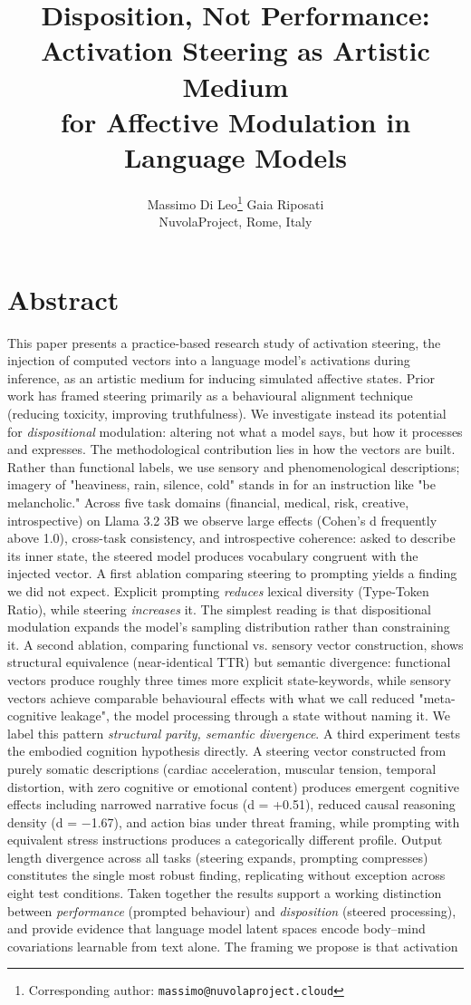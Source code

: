 \documentclass[11pt,a4paper]{article}
\title{Disposition, Not Performance:\\
Activation Steering as Artistic Medium\\
for Affective Modulation in Language Models}
\author{Massimo Di Leo\thanks{Corresponding author: \texttt{massimo@nuvolaproject.cloud}} \quad Gaia Riposati \\
\small NuvolaProject, Rome, Italy}
\date{}
\begin{document}
\maketitle

\section*{Abstract}

This paper presents a practice-based research study of activation steering, the injection of computed vectors into a language model's activations during inference, as an artistic medium for inducing simulated affective states. Prior work has framed steering primarily as a behavioural alignment technique (reducing toxicity, improving truthfulness). We investigate instead its potential for \emph{dispositional} modulation: altering not what a model says, but how it processes and expresses. The methodological contribution lies in how the vectors are built. Rather than functional labels, we use sensory and phenomenological descriptions; imagery of "heaviness, rain, silence, cold" stands in for an instruction like "be melancholic." Across five task domains (financial, medical, risk, creative, introspective) on Llama 3.2 3B we observe large effects (Cohen's d frequently above 1.0), cross-task consistency, and introspective coherence: asked to describe its inner state, the steered model produces vocabulary congruent with the injected vector. A first ablation comparing steering to prompting yields a finding we did not expect. Explicit prompting \emph{reduces} lexical diversity (Type-Token Ratio), while steering \emph{increases} it. The simplest reading is that dispositional modulation expands the model's sampling distribution rather than constraining it. A second ablation, comparing functional vs. sensory vector construction, shows structural equivalence (near-identical TTR) but semantic divergence: functional vectors produce roughly three times more explicit state-keywords, while sensory vectors achieve comparable behavioural effects with what we call reduced "meta-cognitive leakage", the model processing through a state without naming it. We label this pattern \emph{structural parity, semantic divergence}. A third experiment tests the embodied cognition hypothesis directly. A steering vector constructed from purely somatic descriptions (cardiac acceleration, muscular tension, temporal distortion, with zero cognitive or emotional content) produces emergent cognitive effects including narrowed narrative focus (d = +0.51), reduced causal reasoning density (d = \ensuremath{-}1.67), and action bias under threat framing, while prompting with equivalent stress instructions produces a categorically different profile. Output length divergence across all tasks (steering expands, prompting compresses) constitutes the single most robust finding, replicating without exception across eight test conditions. Taken together the results support a working distinction between \emph{performance} (prompted behaviour) and \emph{disposition} (steered processing), and provide evidence that language model latent spaces encode body--mind covariations learnable from text alone. The framing we propose is that activation 
\end{document}
